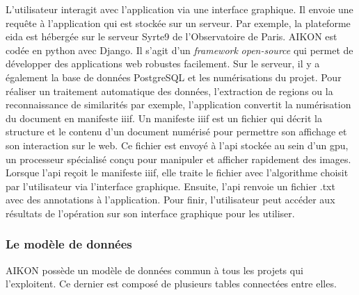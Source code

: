 L'utilisateur interagit avec l'application via une interface graphique. Il envoie une requête à l'application qui est stockée sur un serveur. Par exemple, la plateforme \gls{eida} est hébergée sur le serveur Syrte9 de l'Observatoire de Paris. AIKON est codée en python avec Django. Il s'agit d'un \textit{framework} \textit{open-source} qui permet de développer des applications web robustes facilement. Sur le serveur, il y a également la base de données PostgreSQL et les numérisations du projet. Pour réaliser un traitement automatique des données, l'extraction de regions ou la reconnaissance de similarités par exemple, l'application convertit la numérisation du document en manifeste \gls{iiif}. Un manifeste \gls{iiif} est un fichier qui décrit la structure et le contenu d'un document numérisé pour permettre son affichage et son interaction sur le web. Ce fichier est envoyé à l'\gls{api} stockée au sein d'un \gls{gpu}, un processeur spécialisé conçu pour manipuler et afficher rapidement des images. Lorsque l'\gls{api} reçoit le manifeste \gls{iiif}, elle traite le fichier avec l'algorithme choisit par l'utilisateur via l'interface graphique. Ensuite, l'\gls{api} renvoie un fichier .txt avec des annotations à l'application. Pour finir, l'utilisateur peut accéder aux résultats de l'opération sur son interface graphique pour les utiliser.

\subsubsection{Le modèle de données}

AIKON possède un modèle de données commun à tous les projets qui l'exploitent. Ce dernier est composé de plusieurs tables connectées entre elles.

